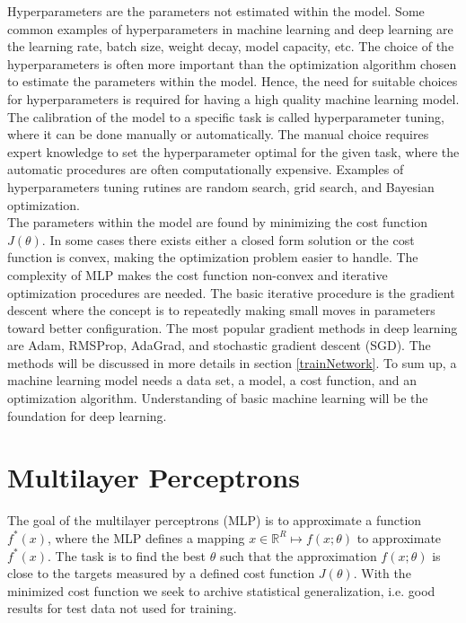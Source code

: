Hyperparameters are the parameters not estimated within the model. Some common examples of hyperparameters in machine learning and deep learning are the learning rate, batch size, weight decay, model capacity, etc. The choice of the hyperparameters is often more important than the optimization algorithm chosen to estimate the parameters within the model. Hence, the need for suitable choices for hyperparameters is required for having a high quality machine learning model. The calibration of the model to a specific task is called hyperparameter tuning, where it can be done manually or automatically. The manual choice requires expert knowledge to set the hyperparameter optimal for the given task, where the automatic procedures are often computationally expensive. Examples of hyperparameters tuning rutines are random search, grid search, and Bayesian optimization.\\

The parameters within the model are found by minimizing the cost function $J(\theta)$. In some cases there exists either a closed form solution or the cost function is convex, making the optimization problem easier to handle. The complexity of MLP makes the cost function non-convex and iterative optimization procedures are needed. The basic iterative procedure is the gradient descent where the concept is to repeatedly making small moves in parameters toward better configuration. The most popular gradient methods in deep learning are Adam, RMSProp, AdaGrad, and stochastic gradient descent (SGD). The methods will be discussed in more details in section \ref{trainNetwork}. To sum up, a machine learning model needs a data set, a model, a cost function, and an optimization algorithm. Understanding of basic machine learning will be the foundation for deep learning.



\section{Multilayer Perceptrons}\label{multilayerPerceptron}
The goal of the multilayer perceptrons (MLP) is to approximate a function $f^*(x)$, where the MLP defines a mapping $x\in \mathbb{R}^R \mapsto f(x;\theta)$ to approximate $f^*(x)$. The task is to find the best $\theta$ such that the approximation $f(x;\theta)$ is close to the targets measured by a defined cost function $J(\theta)$. With the minimized cost function we seek to archive statistical generalization, i.e. good results for test data not used for training. \\


